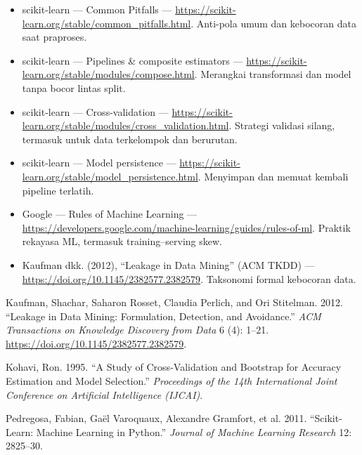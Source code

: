 \begin{bacaan}

\begin{itemize}
\tightlist
\item
  scikit-learn --- Common Pitfalls --- \url{https://scikit-learn.org/stable/common_pitfalls.html}. Anti-pola umum dan kebocoran data saat praproses.
\item
  scikit-learn --- Pipelines \& composite estimators --- \url{https://scikit-learn.org/stable/modules/compose.html}. Merangkai transformasi dan model tanpa bocor lintas split.
\item
  scikit-learn --- Cross-validation --- \url{https://scikit-learn.org/stable/modules/cross_validation.html}. Strategi validasi silang, termasuk untuk data terkelompok dan berurutan.
\item
  scikit-learn --- Model persistence --- \url{https://scikit-learn.org/stable/model_persistence.html}. Menyimpan dan memuat kembali pipeline terlatih.
\item
  Google --- Rules of Machine Learning --- \url{https://developers.google.com/machine-learning/guides/rules-of-ml}. Praktik rekayasa ML, termasuk training--serving skew.
\item
  Kaufman dkk. (2012), ``Leakage in Data Mining'' (ACM TKDD) --- \url{https://doi.org/10.1145/2382577.2382579}. Taksonomi formal kebocoran data.
\end{itemize}

\end{bacaan}

\rujukanheading

\protect{}\label{refs}
\begin{CSLReferences}{1}{1}
Kaufman, Shachar, Saharon Rosset, Claudia Perlich, and Ori Stitelman. 2012. {``Leakage in Data Mining: Formulation, Detection, and Avoidance.''} \emph{ACM Transactions on Knowledge Discovery from Data} 6 (4): 1--21. \url{https://doi.org/10.1145/2382577.2382579}.

Kohavi, Ron. 1995. {``A Study of Cross-Validation and Bootstrap for Accuracy Estimation and Model Selection.''} \emph{Proceedings of the 14th International Joint Conference on Artificial Intelligence (IJCAI)}.

Pedregosa, Fabian, Gaël Varoquaux, Alexandre Gramfort, et al. 2011. {``Scikit-Learn: Machine Learning in {P}ython.''} \emph{Journal of Machine Learning Research} 12: 2825--30.

\end{CSLReferences}

